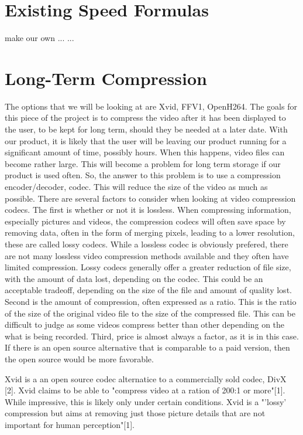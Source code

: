 \documentclass[letterpaper,10pt,onecolumn,draftclsnofoot]{IEEEtran}
\begin{document}
\section{Existing Speed Formulas} %

make our own
...
...

\section{Long-Term Compression} %

The options that we will be looking at are Xvid, FFV1, OpenH264.
The goals for this piece of the project is to compress the video after it has been displayed to the user, to be kept for long term, should they be needed at a later date.
With our product, it is likely that the user will be leaving our product running for a significant amount of time, possibly hours.
When this happens, video files can become rather large.
This will become a problem for long term storage if our product is used often.
So, the answer to this problem is to use a compression encoder/decoder, codec.
This will reduce the size of the video as much as possible.
There are several factors to consider when looking at video compression codecs.
The first is whether or not it is lossless.
When compressing information, especially pictures and videos, the compression codecs will often save space by removing data, often in the form of merging pixels, leading to a lower resolution, these are called lossy codecs.
While a lossless codec is obviously prefered, there are not many lossless video compression methods available and they often have limited compression.
Lossy codecs generally offer a greater reduction of file size, with the amount of data lost, depending on the codec.
This could be an acceptable tradeoff, depending on the size of the file and amount of quality lost.
Second is the amount of compression, often expressed as a ratio.
This is the ratio of the size of the original video file to the size of the compressed file.
This can be difficult to judge as some videos compress better than other depending on the what is being recorded.
Third, price is almost always a factor, as it is in this case.
If there is an open source alternative that is comparable to a paid version, then the open source would be more favorable.

Xvid is a an open source codec alternatice to a commercially sold codec, DivX [2].
Xvid claims to be able to "compress video at a ration of 200:1 or more"[1].
While impressive, this is likely only under certain conditions.
Xvid is a "'lossy' compression but aims at removing just those picture details that are not important for human perception"[1].
\end{document}
